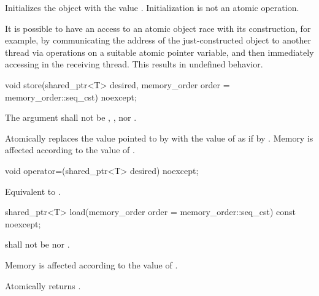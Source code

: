 \begin{itemdescr}
\pnum
\effects
Initializes the object with the value .
Initialization is not an atomic operation.
\begin{note}
It is possible to have an access to
an atomic object  race with its construction,
for example,
by communicating the address of the just-constructed object 
to another thread via  operations
on a suitable atomic pointer variable, and
then immediately accessing  in the receiving thread.
This results in undefined behavior.
\end{note}
\end{itemdescr}

%
\begin{itemdecl}
void store(shared_ptr<T> desired, memory_order order = memory_order::seq_cst) noexcept;
\end{itemdecl}

\begin{itemdescr}
\pnum
\requires
The  argument shall not be
,
, nor
.

\pnum
\effects
Atomically replaces the value pointed to by  with
the value of  as if by .
Memory is affected according to the value of .
\end{itemdescr}

%
\begin{itemdecl}
void operator=(shared_ptr<T> desired) noexcept;
\end{itemdecl}

\begin{itemdescr}
\pnum
\effects
Equivalent to .
\end{itemdescr}

%
\begin{itemdecl}
shared_ptr<T> load(memory_order order = memory_order::seq_cst) const noexcept;
\end{itemdecl}

\begin{itemdescr}
\pnum
\requires
{} shall not be
 nor .

\pnum
\effects
Memory is affected according to the value of .

\pnum
\returns
Atomically returns .
\end{itemdescr}

